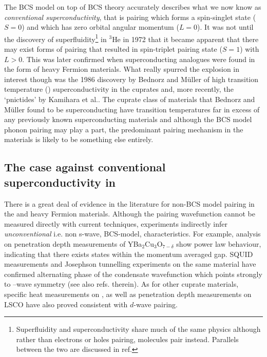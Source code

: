 The \ac{BCS} model on top of \ac{BCS} theory accurately describes what we now know as \emph{conventional superconductivity}, that is pairing which forms a spin-singlet state ($S=0$) and which has zero orbital angular momentum ($L=0$). It was not until the discovery of superfluidity\footnote{Superfluidity and superconductivity share much of the same physics although rather than electrons or holes pairing, molecules pair instead. Parallels between the two are discussed in ref.\cite{Annett2010}} in $^3$He in 1972\cite{Osheroff1972} that it became apparent that there may exist forms of pairing that resulted in spin-triplet pairing state ($S=1$) with $L>0$. This was later confirmed when superconducting analogues were found in the form of heavy Fermion materials. What really spurred the explosion in interest though was the 1986 discovery by Bednorz and M\"uller\cite{Bednorz} of high transition temperature (\Tc) superconductivity in the cuprates and, more recently, the `pnictides' by Kamihara et al.\cite{Kamihara2008}. The cuprate class of materials that Bednorz and M\"uller found to be superconducting have transition temperatures far in excess of any previously known superconducting materials and although the \ac{BCS} model phonon pairing may play a part, the predominant pairing mechanism in the \highTc materials is likely to be something else entirely.

\subsection{The case against conventional superconductivity in \highTc}

There is a great deal of evidence in the literature for non-\ac{BCS} model pairing in the \highTc and heavy Fermion materials. Although the pairing wavefunction cannot be measured directly with current techniques, experiments indirectly infer \emph{unconventional} i.e. non s-wave, \ac{BCS}-model, characteristics. For example, analysis on penetration depth measurements of YBa$_2$Cu$_3$O$_{7-\delta}$ show power law behaviour\cite{Annett1991}, indicating that there exists states within the momentum averaged gap. SQUID measurements and Josephson tunnelling experiments on the same material have confirmed alternating phase of the condensate wavefunction which points strongly to \DxTwoyTwo--wave symmetry\cite{VanHarlingen1994} (see also refs. therein). As for other cuprate materials, specific heat measurements on \BSCO\cite{Wang2011}, as well as penetration depth measurements on LSCO\cite{Froehlich1996} have also proved consistent with $d$-wave pairing. 

